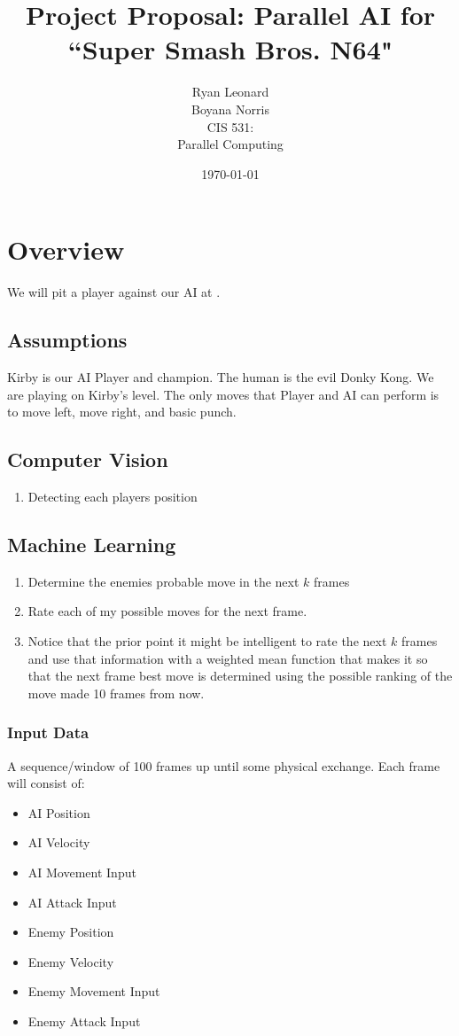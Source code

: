 \documentclass[12pt]{article}
\title{Project Proposal: Parallel AI for ``Super Smash Bros. N64"}
\author{
        Ryan Leonard \\
        Boyana Norris \\
        CIS 531: \\
        Parallel Computing
}
\date{\today}
\begin{document}
\maketitle

\section{Overview}
We will pit a player against our AI at .

\subsection{Assumptions}
Kirby is our AI Player and champion.
The human is the evil Donky Kong.
We are playing on Kirby's level.
The only moves that Player and AI can perform is to move left, move right, and basic punch. 

\subsection{Computer Vision}
\begin{enumerate}
\item Detecting each players position
\end{enumerate}

\subsection{Machine Learning}
\begin{enumerate}
\item Determine the enemies probable move in the next $k$ frames
\item Rate each of my possible moves for the next frame.
\item Notice that the prior point it might be intelligent to rate the next $k$ frames and use that information with a weighted mean function that makes it so that the next frame best move is determined using the possible ranking of the move made 10 frames from now.
\end{enumerate}

\subsubsection{Input Data}
A sequence/window of 100 frames up until some physical exchange.
Each frame will consist of:
\begin{itemize}
\item AI Position
\item AI Velocity
\item AI Movement Input
\item AI Attack Input
\item Enemy Position
\item Enemy Velocity
\item Enemy Movement Input
\item Enemy Attack Input
\end{itemize}
\end{document}
